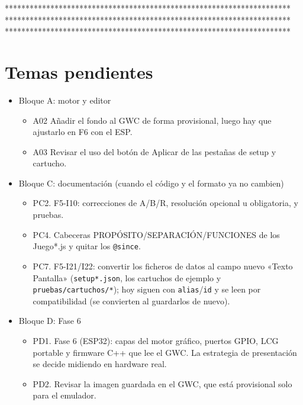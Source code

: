 *********************************************************************\\
*********************************************************************\\
*********************************************************************\\

\section*{Temas pendientes}
\begin{itemize}
	
	\item Bloque A: motor y editor 
	\begin{itemize}
		\item A02 Añadir el fondo al GWC de forma provisional, luego hay que ajustarlo en F6 con el ESP.
		\item A03 Revisar el uso del botón de Aplicar de las pestañas de setup y cartucho.
	\end{itemize}
	
	\item Bloque C: documentación (cuando el código y el formato ya no cambien)
	\begin{itemize}
		\item PC2. F5-I10: correcciones de A/B/R, resolución opcional u obligatoria, y pruebas.
		
		\item PC4. Cabeceras PROPÓSITO/SEPARACIÓN/FUNCIONES de los Juego*.js y quitar los \texttt{@since}.
		
		\item PC7. F5-I21/I22: convertir los ficheros de datos al campo nuevo «Texto Pantalla» (\texttt{setup*.json}, los cartuchos de ejemplo y \texttt{pruebas/cartuchos/*}); hoy siguen con \texttt{alias}/\texttt{id} y se leen por compatibilidad (se convierten al guardarlos de nuevo).
	\end{itemize}
	
	\item Bloque D: Fase 6
	\begin{itemize}
		\item PD1. Fase 6 (ESP32): capas del motor gráfico, puertos GPIO, LCG portable y firmware C++ que lee el GWC. La estrategia de presentación se decide midiendo en hardware real.
		\item PD2. Revisar la imagen guardada en el GWC, que está provisional solo para el emulador.
	\end{itemize}
	
\end{itemize}
\clearpage

